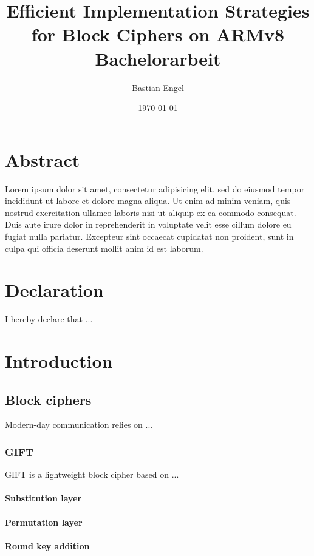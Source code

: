 \documentclass[12pt]{report}
\title{
\textbf{Efficient Implementation Strategies for Block Ciphers on ARMv8}\\
{\footnotesize Bachelorarbeit}
}
\author{Bastian Engel}
\date{\today}
\begin{document}
\maketitle

\chapter*{Abstract}

Lorem ipsum dolor sit amet, consectetur adipisicing elit, sed do eiusmod tempor
incididunt ut labore et dolore magna aliqua. Ut enim ad minim veniam, quis
nostrud exercitation ullamco laboris nisi ut aliquip ex ea commodo consequat.
Duis aute irure dolor in reprehenderit in voluptate velit esse cillum dolore eu
fugiat nulla pariatur. Excepteur sint occaecat cupidatat non proident, sunt in
culpa qui officia deserunt mollit anim id est laborum.

\chapter*{Declaration}

I hereby declare that ...

\tableofcontents

\chapter{Introduction}
\section{Block ciphers}

Modern-day communication relies on ...

\subsection{GIFT}

GIFT is a lightweight block cipher based on ...

\subsubsection{Substitution layer}

\subsubsection{Permutation layer}

\subsubsection{Round key addition}
\end{document}
